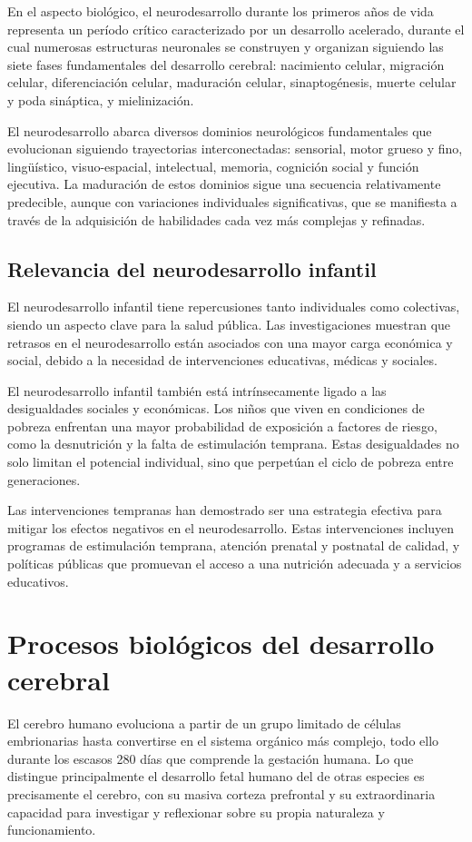 \documentclass[11pt,letterpaper]{report}
\begin{document}
En el aspecto biológico, el neurodesarrollo durante los primeros años de vida
representa un período crítico caracterizado por un desarrollo acelerado, 
durante el cual numerosas estructuras neuronales se construyen y organizan 
siguiendo las siete fases fundamentales del desarrollo cerebral: nacimiento 
celular, migración celular, diferenciación celular, maduración celular, 
sinaptogénesis, muerte celular y poda sináptica, y mielinización.
\cite{Kolb7}

El neurodesarrollo abarca diversos dominios neurológicos fundamentales que 
evolucionan siguiendo trayectorias interconectadas: sensorial, motor grueso y
fino, lingüístico, visuo-espacial, intelectual, memoria, cognición social y
función ejecutiva. La maduración de estos dominios sigue una secuencia
relativamente predecible, aunque con  variaciones individuales significativas,
que se manifiesta a través de la  adquisición de habilidades cada vez más
complejas y refinadas. \cite{Nelson49}

\subsection{Relevancia del neurodesarrollo infantil}
El neurodesarrollo infantil tiene repercusiones tanto individuales como
colectivas, siendo un aspecto clave para la salud pública. Las investigaciones
muestran que retrasos en el neurodesarrollo están asociados con una mayor carga
económica y social, debido a la necesidad de intervenciones educativas, médicas
y sociales.

El neurodesarrollo infantil también está intrínsecamente ligado a las 
desigualdades sociales y económicas. Los niños que viven en condiciones de 
pobreza enfrentan una mayor probabilidad de exposición a factores de riesgo, 
como la desnutrición y la falta de estimulación temprana. Estas desigualdades 
no solo limitan el potencial individual, sino que perpetúan el ciclo de pobreza 
entre generaciones. \cite{UNICEF2023}

Las intervenciones tempranas han demostrado ser una estrategia efectiva para 
mitigar los efectos negativos en el neurodesarrollo. Estas intervenciones
incluyen programas de estimulación temprana, atención prenatal y postnatal de
calidad, y políticas públicas que promuevan el acceso a una nutrición adecuada
y a servicios educativos.

\section{Procesos biológicos del desarrollo cerebral}
El cerebro humano evoluciona a partir de un grupo limitado de células
embrionarias hasta convertirse en el sistema orgánico más complejo, todo ello
durante los escasos 280 días que comprende la gestación humana. Lo que 
distingue principalmente el desarrollo fetal humano del de otras especies es 
precisamente el cerebro, con su masiva corteza prefrontal y su extraordinaria 
capacidad para investigar y reflexionar sobre su propia naturaleza y 
funcionamiento. \cite{Polin124}
\end{document}
